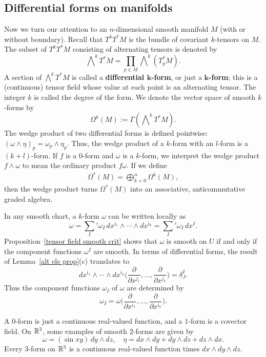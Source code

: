 \subsection{Differential forms on manifolds}
Now we turn our attention to an $n$-dimensional smooth manifold $M$ (with or without boundary). Recall that $T^kT^*M$ is the bundle of covariant $k$-tensors on $M$. The subset of $T^kT^*M$ consisting of alternating tensors is denoted by
\[\bigwedge\nolimits^kT^*M=\prod_{p\in M}\bigwedge\nolimits^k(T^*_pM).\]
A section of $\bigwedge^kT^*M$ is called a \textbf{differential $\bm{k}$-form}, or just a \textbf{$\bm{k}$-form}; this is a (continuous) tensor field whose value at each point is an alternating tensor. The integer $k$ is called the degree of the form. We denote the vector space of smooth $k$-forms by
\[\Omega^k(M):=\Gamma(\bigwedge\nolimits^kT^*M).\]
The wedge product of two differential forms is defined pointwise: $(\omega\wedge\eta)_p=\omega_p\wedge\eta_p$. Thus, the wedge product of a $k$-form with an $l$-form is a $(k+l)$-form. If $f$ is a $0$-form and $\omega$ is a $k$-form, we interpret the wedge product $f\wedge\omega$ to mean the ordinary product $f\omega$. If we define 
\begin{align*}
\Omega^*(M)=\bigoplus_{k=0}^{n}\Omega^k(M),
\end{align*}
then the wedge product turns $\Omega^*(M)$ into an associative, anticommutative graded algebra.\par 
In any smooth chart, a $k$-form $\omega$ can be written locally as
\[\omega=\sum_{I}'\omega_I\,dx^{i_1}\wedge\cdots\wedge dx^{i_k}=\sum_{I}'\omega_I\,dx^I.\]
Proposition~\ref{tensor field smooth crit} shows that $\omega$ is smooth on $U$ if and only if the component functions $\omega^I$ are smooth. In terms of differential forms, the result of Lemma~\ref{alt ele prop}(c) translates to
\[dx^{i_1}\wedge\cdots\wedge dx^{i_k}\Big(\frac{\partial}{\partial x^{j_1}},\dots,\frac{\partial}{\partial x^{j_k}}\Big)=\delta^I_J.\]
Thus the component functions $\omega_I$ of $\omega$ are determined by
\[\omega_I=\omega\Big(\frac{\partial}{\partial x^{i_1}},\dots,\frac{\partial}{\partial x^{i_k}}\Big).\]
\begin{example}
A $0$-form is just a continuous real-valued function, and a $1$-form is a covector field. On $\mathbb{R}^3$, some examples of smooth $2$-forms are given by
\[\omega=(\sin xy)\,dy\wedge dz,\quad\eta=dx\wedge dy+dy\wedge dz+ dz\wedge dx.\]
Every $3$-form on $\mathbb{R}^3$ is a continuous real-valued function times $dx\wedge dy\wedge dz$.
\end{example}
